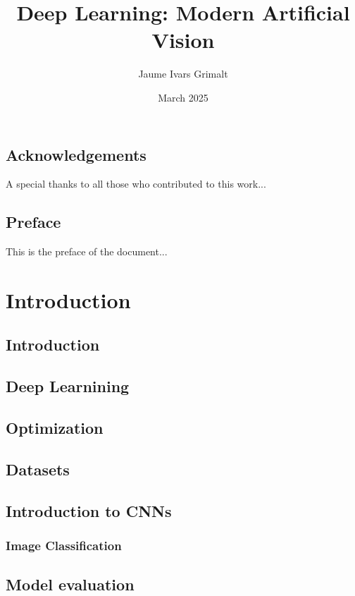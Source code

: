 \documentclass{report} %
\title{Deep Learning: Modern Artificial Vision}
\author{Jaume Ivars Grimalt }
\date{March 2025}
\begin{document}
\maketitle

\chapter*{Acknowledgements}
A special thanks to all those who contributed to this work...
\newpage

\chapter*{Preface}
This is the preface of the document...
\newpage

\tableofcontents %

\newpage


\part{Introduction}

\chapter{Introduction}
\chapter{Deep Learnining}
\chapter{Optimization}
\chapter{Datasets}
\chapter{Introduction to CNNs}
\section{Image Classification}
\chapter{Model evaluation}
\end{document}
